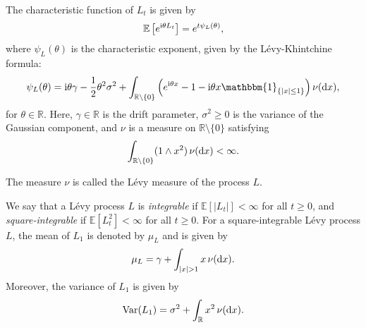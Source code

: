 \documentclass[10pt,a4paper,reqno]{amsart}
\theoremstyle{example}
\newcommand*\D{\mathop{}\!\textnormal{d}}
\newcommand*\I{\mathop{}\!\textnormal{i}}
\begin{document}
The characteristic function of $L_t$ is given by
\begin{align*}
\mathbb{E}\left[ e^{\I \theta L_t} \right] = e^{ t \psi_L(\theta) },  
\end{align*}
where $\psi_L(\theta)$ is the characteristic exponent, given by the
L\'evy-Khintchine formula: 
\begin{align}
\psi_L(\theta) = \I \theta \gamma - \frac{1}{2} \theta^{2} \sigma^{2} +
  \int_{\mathbb{R} \setminus \{0\}} \left( e^{\I \theta x} - 1 - \I \theta x
  \mathbbm{1}_{\{|x| \leq 1\}} \right) \nu(\D x), \label{eq:levy-khintchine} 
\end{align}
for $\theta \in \mathbb{R}$. Here, $\gamma \in \mathbb{R}$ is the drift
parameter, $\sigma^{2} \geq 0$ is the variance of the Gaussian component, and
$\nu$ is a measure on $\mathbb{R} \setminus \{0\}$ satisfying  
\begin{align*}
\int_{\mathbb{R} \setminus \{0\}} (1 \wedge x^{2}) \, \nu(\D x) < \infty.  
\end{align*}

The measure $\nu$ is called the L\'evy measure of the process $L$.

We say that a L\'evy process $L$ is \emph{integrable} if $\mathbb{E}[|L_t|] <
\infty$ for all $t \geq 0$, and \emph{square-integrable} if $\mathbb{E}[L_t^{2}]
< \infty$ for all $t \geq 0$. For a square-integrable L\'evy process $L$, the
mean of $L_1$ is denoted by $\mu_L$ and is given by 
\begin{align*}
\mu_L = \gamma + \int_{|x| > 1} x \, \nu(\D x).  
\end{align*}
Moreover, the variance of $L_1$ is given by
\begin{align*}
\operatorname{Var}(L_1) = \sigma^{2} + \int_{\mathbb{R}} x^{2} \, \nu(\D x).  
\end{align*}
\end{document}
